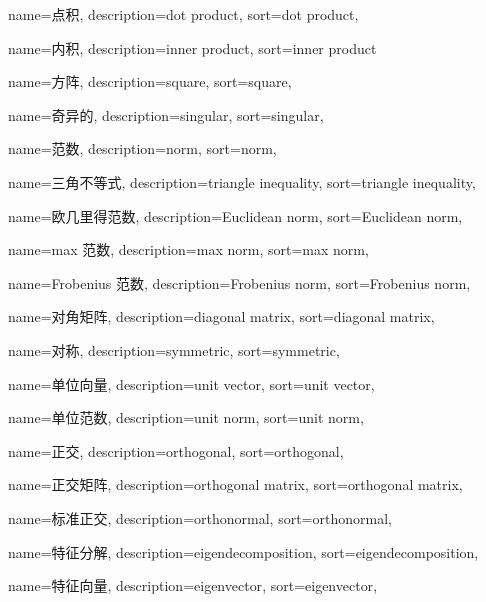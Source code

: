 {
  name=点积,
  description={dot product},
  sort={dot product},
}

{
  name=内积,
  description={inner product},
  sort={inner product}
}

{
  name=方阵,
  description={square},
  sort={square},
}

{
  name=奇异的,
  description={singular},
  sort={singular},
}

{
  name=范数,
  description={norm},
  sort={norm},
}

{
  name=三角不等式,
  description={triangle inequality},
  sort={triangle inequality},
}

{
  name=欧几里得范数,
  description={Euclidean norm},
  sort={Euclidean norm},
}

{
  name=max 范数,
  description={max norm},
  sort={max norm},
}

{
  name=Frobenius 范数,
  description={Frobenius norm},
  sort={Frobenius norm},
}

{
  name=对角矩阵,
  description={diagonal matrix},
  sort={diagonal matrix},
}

{
  name=对称,
  description={symmetric},
  sort={symmetric},
}

{
  name=单位向量,
  description={unit vector},
  sort={unit vector},
}

{
  name=单位范数,
  description={unit norm},
  sort={unit norm},
}

{
  name=正交,
  description={orthogonal},
  sort={orthogonal},
}

{
  name=正交矩阵,
  description={orthogonal matrix},
  sort={orthogonal matrix},
}

{
  name=标准正交,
  description={orthonormal},
  sort={orthonormal},
}

{
  name=特征分解,
  description={eigendecomposition},
  sort={eigendecomposition},
}

{
  name=特征向量,
  description={eigenvector},
  sort={eigenvector},
}

